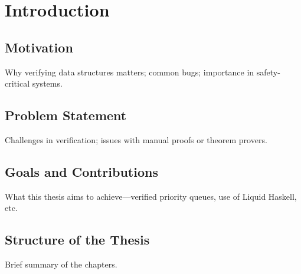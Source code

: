\chapter{Introduction} %

\section{ Motivation }
Why verifying data structures matters; common bugs; importance in safety-critical systems.

\section{ Problem Statement }
Challenges in verification; issues with manual proofs or theorem provers.

\section{ Goals and Contributions }
What this thesis aims to achieve—verified priority queues, use of Liquid Haskell, etc.

\section{ Structure of the Thesis }
Brief summary of the chapters.
